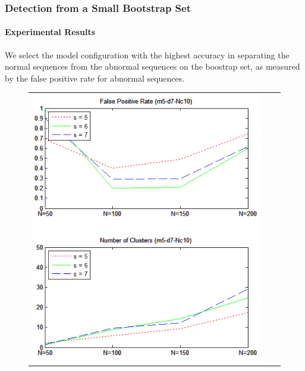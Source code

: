 
\begin{frame}
    \frametitle{Detection from a Small Bootstrap Set}
    \framesubtitle{Experimental Results}

    We select the model configuration with the highest accuracy in separating 
    the normal sequences from the abnormal sequences on the boostrap set, as 
    measured by the false positive rate for abnormal sequences.
    \begin{figure}
        \centering
        \begin{tabular}{ccc}
            \includegraphics[scale=0.23]{figures/model-configuration01} &

\end{tabular}
\end{figure}
\end{frame}

